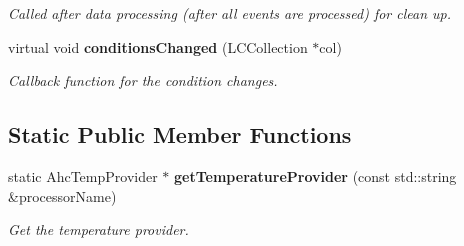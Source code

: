 \begin{DoxyCompactItemize}
\begin{DoxyCompactList}\small\item\em Called after data processing (after all events are processed) for clean up. \item\end{DoxyCompactList}\item 
virtual void {\bf conditionsChanged} (LCCollection $\ast$col)
\begin{DoxyCompactList}\small\item\em Callback function for the condition changes. \item\end{DoxyCompactList}\end{DoxyCompactItemize}
\subsection*{Static Public Member Functions}
\begin{DoxyCompactItemize}
\item 
static AhcTempProvider $\ast$ {\bf getTemperatureProvider} (const std::string \&processorName)
\begin{DoxyCompactList}\small\item\em Get the temperature provider. \item\end{DoxyCompactList}\end{DoxyCompactItemize}

